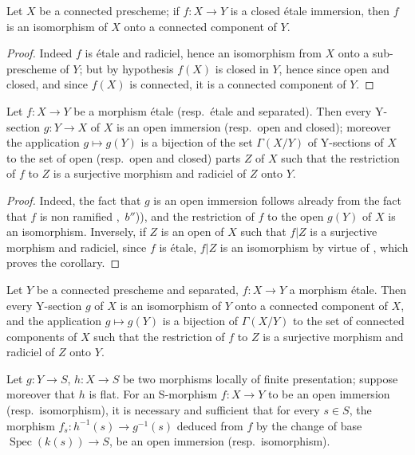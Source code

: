 \begin{corollary}[17.9.2]
\label{IV.17.9.2}
Let $X$ be a connected prescheme; if $f:X\to Y$ is a closed \'etale immersion, then $f$ is an isomorphism of $X$ onto a connected component of $Y$.
\end{corollary}

\begin{proof}
Indeed $f$ is \'etale and radiciel, hence an isomorphism from $X$ onto a sub-prescheme of $Y$; but by hypothesis $f(X)$ is closed in $Y$, hence since open and closed, and since $f(X)$ is connected, it is a connected component of $Y$.
\end{proof}


\begin{corollary}[17.9.3]
\label{IV.17.9.3}
Let $f:X\to Y$ be a morphism \'etale (resp.\ \'etale and separated).
Then every Y-section $g:Y\to X$ of $X$ is an open immersion (resp.\ open and closed); moreover the application $g\mapsto g(Y)$ is a bijection of the set $\Gamma(X/Y)$ of Y-sections of $X$ to the set of open (resp.\ open and closed) parts $Z$ of $X$ such that the restriction of $f$ to $Z$ is a surjective morphism and radiciel of $Z$ onto $Y$.
\end{corollary}

\begin{proof}
Indeed, the fact that $g$ is an open immersion follows already from the fact that $f$ is non ramified ,~$b''$)), and the restriction of $f$ to the open $g(Y)$ of $X$ is an isomorphism.
Inversely, if $Z$ is an open of $X$ such that $f|Z$ is a surjective morphism and radiciel, since $f$ is \'etale, $f|Z$ is an isomorphism by virtue of , which proves the corollary.
\end{proof}

\begin{corollary}[17.9.4]
\label{IV.17.9.4}
Let $Y$ be a connected prescheme and separated, $f:X\to Y$ a morphism \'etale.
Then every Y-section $g$ of $X$ is an isomorphism of $Y$ onto a connected component of $X$, and the application $g\mapsto g(Y)$ is a bijection of $\Gamma(X/Y)$ to the set of connected components of $X$ such that the restriction of $f$ to $Z$ is a surjective morphism and radiciel of $Z$ onto $Y$.
\end{corollary}

\begin{corollary}[17.9.5]
\label{IV.17.9.5}
Let $g:Y\to S$, $h:X\to S$ be two morphisms locally of finite presentation; suppose moreover that $h$ is flat.
For an S-morphism $f:X\to Y$ to be an open immersion (resp.\ isomorphism), it is necessary and sufficient that for every $s\in S$, the morphism $f_s:h^{-1}(s)\to g^{-1}(s)$ deduced from $f$ by the change of base $\operatorname{Spec}(k(s))\to S$, be an open immersion (resp.\ isomorphism).
\end{corollary}

